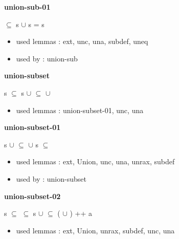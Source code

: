 \documentclass[a4paper]{article}
\begin{document}
\medskip

\bigskip

{\large\bf union-sub-01}

\medskip

 \Fol {} $\subseteq$ s \Imp {} $\cup$ s = s

\begin{itemize}


\item       used lemmas  : ext, unc, una, subdef, uneq
\item       used by      : union-sub

\end{itemize}

\medskip

\bigskip

{\large\bf union-subset}

\medskip

 \Fol s $\subseteq$  \Imp s $\cup$  $\subseteq$  $\cup$ 

\begin{itemize}


\item       used lemmas  : union-subset-01, unc, una

\end{itemize}

\medskip

\bigskip

{\large\bf union-subset-01}

\medskip

 \Fol \Not s $\cup$  $\subseteq$  $\cup$  \Imp \Not s $\subseteq$ 

\begin{itemize}


\item       used lemmas  : ext, Union, unc, una, unrax, subdef
\item       used by      : union-subset

\end{itemize}

\medskip

\bigskip

{\large\bf union-subset-02}

\medskip

 \Fol s $\subseteq$  \And {} $\subseteq$  \Imp s $\cup$  $\subseteq$ ( $\cup$ ) ++ a

\begin{itemize}


\item       used lemmas  : ext, Union, unrax, subdef, unc, una

\end{itemize}
\end{document}

